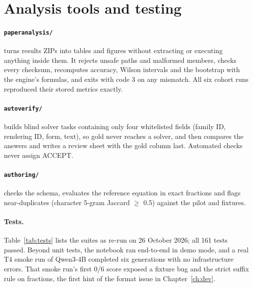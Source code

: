 \documentclass[12pt,a4paper,oneside]{report}
\renewcommand{\_}{\oldunderscore\allowbreak}
\begin{document}
\section{Analysis tools and testing}

\paragraph{\texttt{paper\_analysis/}} turns results ZIPs into tables and figures without extracting or executing anything inside them. It rejects unsafe paths and malformed members, checks every checksum, recomputes accuracy, Wilson intervals and the bootstrap with the engine's formulas, and exits with code 3 on any mismatch. All six cohort runs reproduced their stored metrics exactly.

\paragraph{\texttt{autoverify/}} builds blind solver tasks containing only four whitelisted fields (family ID, rendering ID, form, text), so gold never reaches a solver, and then compares the answers and writes a review sheet with the gold column last. Automated checks never assign ACCEPT. \paragraph{\texttt{authoring/}} checks the schema, evaluates the reference equation in exact fractions and flags near-duplicates (character 5-gram Jaccard $\ge$ 0.5) against the pilot and fixtures.

\paragraph{Tests.} Table~\ref{tab:tests} lists the suites as re-run on 26 October 2026; all 161 tests passed. Beyond unit tests, the notebook ran end-to-end in demo mode, and a real T4 smoke run of Qwen3-4B completed six generations with no infrastructure errors. That smoke run's first 0/6 score exposed a fixture bug and the strict suffix rule on fractions, the first hint of the format issue in Chapter~\ref{ch:dev}.
\end{document}
